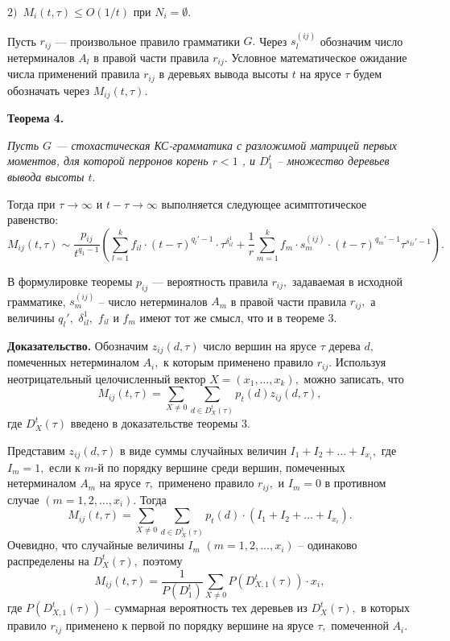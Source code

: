 \documentclass[12pt,russian]{article}
\begin{document}
{{$2)\,\,\, M_i(t,\tau)\le O(1/t)$ при $N_i = \emptyset$.

}

\medskip

Пусть $r_{ij}$ --- произвольное правило грамматики $G.$
Через $s_l^{(ij)}$ обозначим число нетерминалов $A_l$
в правой части правила $r_{ij}.$
Условное математическое ожидание числа применений правила $r_{ij}$
в деревьях вывода высоты $t$ на ярусе $\tau$ будем обозначать через
$M_{ij}(t,\tau).$

\medskip

\textbf {Теорема 4.} 
{\em Пусть $G$ --- стохастическая КС-грамматика с разложимой
матрицей первых моментов, для которой перронов корень $r<1$ , и $D^t_1$ -- множество деревьев вывода
высоты $t.$

Тогда при $\tau \rightarrow \infty $ и $t-\tau \rightarrow \infty $
выполняется следующее асимптотическое равенство:
$$
M_{ij}(t,\tau)\sim \frac{p_{ij}}{t^{q_1-1}} \left(\sum_{l =1}^k f_{il} \cdot (t-\tau)^{q_l'-1}\cdot \tau^{\delta_{il}^1}+ 
\frac{1}{{r }} \sum_{m=1}^k f_m\cdot s_m^{(ij)}\cdot
 (t-\tau)^{q_m'-1}\tau^{s_{1i}'-1}\right).
$$
}
В формулировке теоремы $p_{ij}$ --- вероятность правила $r_{ij},$ задаваемая в исходной грамматике,
$s_m^{(ij)}$ -- число нетерминалов $A_m$ в правой части правила $r_{ij},$
а величины $q_l',$ $\delta_{il}^1,$ $f_{il}$ и $f_m$
имеют тот же смысл, что и в теореме 3.

\medskip

\textbf {Доказательство.} \nopagebreak
Обозначим $z_{ij}(d,\tau)$ число вершин на ярусе $\tau$ дерева $d,$
помеченных нетерминалом $A_i,$ к которым применено правило $r_{ij}.$
Используя неотрицательный целочисленный вектор $X=(x_1,\ldots,x_k),$ можно записать, что
$$
M_{ij}(t,\tau)= \sum_{X \ne 0}
\sum_{d \in D_X^t(\tau)} p_t(d) z_{ij}(d,\tau),
$$
где $D_X^t(\tau)$ введено в доказательстве теоремы 3.

Представим $z_{ij}(d,\tau)$ в виде суммы случайных величин
$I_1+I_2+ \ldots+I_{x_i},$
где $I_m=1,$ если к $m$-й по порядку вершине среди вершин,
помеченных нетерминалом $A_m$ на ярусе $\tau,$
применено правило $r_{ij},$ и $I_m=0$ в противном случае
$(m=1,2, \ldots, x_i).$
Тогда
$$
M_{ij}(t,\tau)= \sum_{X \ne 0}
\sum_{d \in D_X^t(\tau)} p_t(d)\cdot (I_1+I_2+\ldots +I_{x_i}).
$$
Очевидно, что случайные величины $I_m$ $(m=1,2, \ldots, x_i)$ --
одинаково распределены на $D_X^t(\tau),$ поэтому
$$
M_{ij}(t,\tau)=\frac{1}{P(D^t_1)}\sum_{X \ne 0}
P\left(D_{X,1}^t(\tau)\right) \cdot x_i,
$$
где $P(D_{X,1}^t(\tau))$ -- суммарная вероятность тех деревьев
из $D_X^t(\tau),$ в которых правило $r_{ij}$ применено к первой по порядку
вершине на ярусе $\tau,$ помеченной $A_i.$

}
\end{document}
